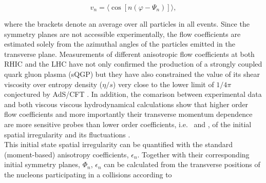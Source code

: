 
\begin{equation}
v_{n} = \langle{\cos[n(\varphi - \Psi_n)]}\rangle,
\label{Eq:vn}
\end{equation}

where the brackets denote an average over all particles in all events. Since the symmetry planes are not accessible experimentally, the flow coefficients are estimated solely from the azimuthal angles of the particles emitted in the transverse plane. Measurements of different anisotropic flow coefficients at both RHIC \cite{Adams:2003am,Abelev:2007qg,Adler:2003kt,Adare:2006ti} and the LHC \cite{Abelev:2014pua,Adam:2016nfo,Acharya:2018zuq} have not only confirmed the production of a strongly coupled quark gluon plasma (sQGP) but they have also constrained the value of its shear viscosity over entropy density ($\eta/s$) very close to the lower limit of $1/4\pi$ conjectured by AdS/CFT \cite{Kovtun:2004de}. In addition, the comarison between experimental data  \cite{Adam:2016izf} and both viscous viscous hydrodynamical calculations show that higher order flow coefficients and more importantly their transverse momentum dependence are more sensitive probes than lower order coefficients, i.e. \vtwo~and \vthree, of the initial spatial irregularity and its fluctuations \cite{Alver:2010dn}.\\ %
This initial state spatial irregularity can be quantified with the standard (moment-based) anisotropy coefficients, $\epsilon_{n}$. Together with their corresponding initial symmetry planes, $\Phi_n$,  $\epsilon_{n}$ can be calculated from the transverse positions of the nucleons participating in a collisions according to \cite{Teaney:2010vd,Teaney:2013dta}

